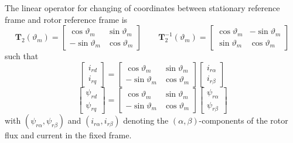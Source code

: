 \documentclass[11pt,a4paper,oneside]{book}
\numberwithin{equation}{section}
\theoremstyle{it}
\theoremstyle{definition}
\begin{document}
The linear operator for changing of coordinates between stationary reference 
frame and rotor reference frame is
\begin{equation}\label{im_eq_12}
	\mathbf{T}_2(\vartheta_{m})=\begin{bmatrix}
		\cos\vartheta_m & \sin\vartheta_m \\[6pt]
		-\sin\vartheta_m & \cos\vartheta_m
	\end{bmatrix} \qquad
	\mathbf{T}_2^{-1}(\vartheta_{m})=\begin{bmatrix}
		\cos\vartheta_m & -\sin\vartheta_m \\[6pt]
		\sin\vartheta_m & \cos\vartheta_m
	\end{bmatrix}
\end{equation}
such that
\begin{equation}\label{im_eq_13}
	\left[
	\begin{matrix}
		i_{rd} \\
		i_{rq}
	\end{matrix} \right] = 
	\left[
	\begin{matrix}
		\cos\vartheta_m & \sin\vartheta_m \\[6pt]
		-\sin\vartheta_m & \cos\vartheta_m
	\end{matrix} \right]
	\left[
	\begin{matrix}
		i_{r\alpha} \\[6pt]
		i_{r\beta}
	\end{matrix} \right]
\end{equation}
\begin{equation}\label{im_eq_14}
	\left[
	\begin{matrix}
		\psi_{rd} \\[6pt]
		\psi_{rq}
	\end{matrix} \right] = 
	\left[
	\begin{matrix}
		\cos\vartheta_m & \sin\vartheta_m \\[6pt]
		-\sin\vartheta_m & \cos\vartheta_m
	\end{matrix} \right]
	\left[
	\begin{matrix}
		\psi_{r\alpha} \\[6pt]
		\psi_{r\beta}
	\end{matrix} \right]
\end{equation}
with $(\psi_{r\alpha},\psi_{r\beta})$ and $(i_{r\alpha}, i_{r\beta})$ denoting 
the $(\alpha,\beta)$-components of the rotor flux and current in the fixed 
frame.
\end{document}
